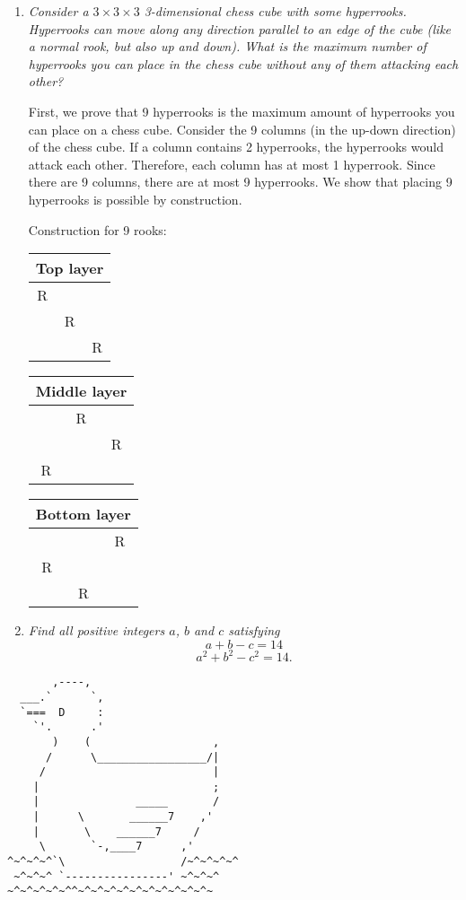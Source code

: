 \documentclass{article}
\begin{document}
\begin{enumerate}[1.]
\item %
{\itshape Consider a $3\times3\times3$ 3-dimensional chess cube with some hyperrooks.
Hyperrooks can move along any direction parallel to an edge of the cube (like a normal rook, but also up and down).
What is the maximum number of hyperrooks you can place in the chess cube without any of them attacking each other?}

First, we prove that 9 hyperrooks is the maximum amount of hyperrooks you can place on a chess cube. Consider the 9 columns (in the up-down direction) of the chess cube. If a column contains 2 hyperrooks, the hyperrooks would attack each other. Therefore, each column has at most 1 hyperrook. Since there are 9 columns, there are at most 9 hyperrooks. We show that placing 9 hyperrooks is possible by construction.

Construction for 9 rooks:
\begin{table}[h]
\centering
\begin{tabular}{| c | c| c |}
\multicolumn{3}{c}{Top layer}\\
\hline
R& &\\
\hline
&R&\\
\hline
&&R\\
\hline
\end{tabular}
\quad
\begin{tabular}{| c | c| c |}
\multicolumn{3}{c}{Middle layer}\\
\hline
&R &\\
\hline
&&R\\
\hline
R&&\\
\hline
\end{tabular}
\quad
\begin{tabular}{| c | c| c |}
\multicolumn{3}{c}{Bottom layer}\\
\hline
& &R\\
\hline
R&&\\
\hline
&R&\\
\hline
\end{tabular}
\end{table}

\item %
{\itshape Find all positive integers $a$, $b$ and $c$ satisfying 
$$a + b - c = 14$$
$$a^2 + b^2 - c^2 = 14.$$}


\end{enumerate}

\vfill
\centering
\tiny
\begin{BVerbatim}
       ,----,
  ___.`      `,
  `===  D     :
    `'.      .'
       )    (                   ,
      /      \_________________/|
     /                          |
    |                           ;
    |               _____       /
    |      \       ______7    ,'
    |       \    ______7     /
     \       `-,____7      ,'   
^~^~^~^`\                  /~^~^~^~^
 ~^~^~^ `----------------' ~^~^~^
~^~^~^~^~^^~^~^~^~^~^~^~^~^~^~^~
\end{BVerbatim}
\end{document}
